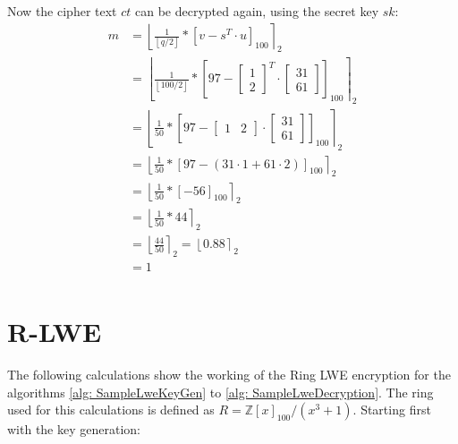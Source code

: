 Now the cipher text $ct$ can be decrypted again, using the secret key $sk$:
\begin{align*}
  m & = \left\lfloor \frac{1}{\left\lfloor q/2\right\rfloor} *\left[v-s^T \cdot u\right]_{100} \right\rceil _2 \\
    & = \left\lfloor \frac{1}{\left\lfloor 100/2\right\rfloor} * \left[97-
  \begin{bmatrix}
      1 \\
      2
    \end{bmatrix}^T
  \cdot
  \begin{bmatrix}
      31 \\
      61
    \end{bmatrix} \right]_{100}\right\rceil _2                                                      \\
    & = \left\lfloor \frac{1}{50} * \left[97-
  \begin{bmatrix}
      1 & 2 
    \end{bmatrix}
  \cdot 
  \begin{bmatrix}
      31 \\ 
      61
    \end{bmatrix}\right]_{100}\right\rceil _2                                                       \\
    & = \left\lfloor \frac{1}{50} * \left[97-(31 \cdot 1 + 61 \cdot 2)\right]_{100}\right\rceil _2            \\
    & = \left\lfloor \frac{1}{50} * \left[-56\right] _{100}\right\rceil _2                               \\
    & = \left\lfloor \frac{1}{50} * 44\right\rceil _2                                        \\
    & = \left\lfloor \frac{44}{50}\right\rceil _2  = \left\lfloor 0.88\right\rceil _2        \\
    & = 1                                                                                    \\
\end{align*}

\section{R-LWE}
\label{app:RlweExampleCalc}
The following calculations show the working of the Ring LWE encryption for the algorithms \ref{alg: SampleLweKeyGen} to \ref{alg: SampleLweDecryption}. The ring used for this calculations is defined as $R=\mathbb{Z}[x]_{100}/(x^3+1)$. Starting first with the key generation:

